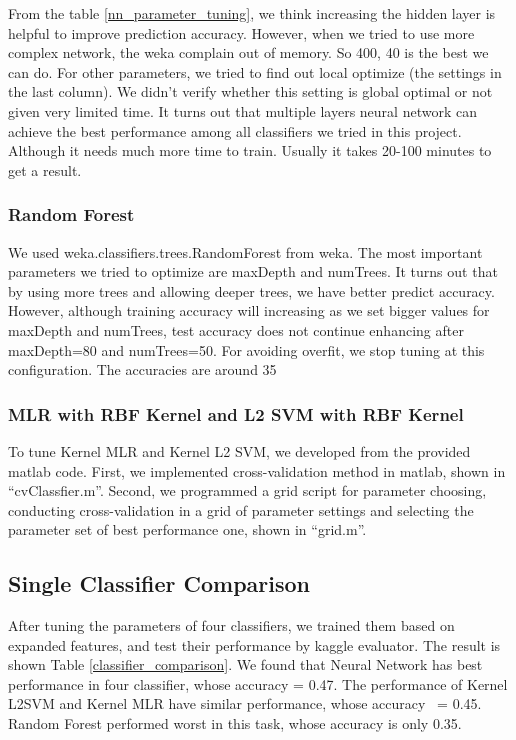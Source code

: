 \documentclass{acm_proc_article-sp}
\begin{document}
From the table \ref{nn_parameter_tuning}, we think increasing the hidden layer is helpful to improve prediction accuracy. However, when we tried to use more complex network, the weka complain out of memory. So 400, 40 is the best we can do. For other parameters, we tried to find out local optimize (the settings in the last column). We didn’t verify whether this setting is global optimal or not given very limited time.
It turns out that multiple layers neural network can achieve the best performance among all classifiers we tried in this project. Although it needs much more time to train. Usually it takes 20-100 minutes to get a result.

\subsubsection*{Random Forest}

We used weka.classifiers.trees.RandomForest from weka. The most important parameters we tried to optimize are maxDepth and numTrees. It turns out that by using more trees and allowing deeper trees, we have better predict accuracy. However, although training accuracy will increasing as we set bigger values for maxDepth and numTrees, test accuracy does not continue enhancing after maxDepth=80 and numTrees=50. For avoiding overfit, we stop tuning at this configuration. The accuracies are around 35%

\subsubsection*{MLR with RBF Kernel and L2 SVM with RBF Kernel}

To tune Kernel MLR and Kernel L2 SVM, we developed from the provided matlab code. First, we implemented cross-validation method in matlab, shown in “cvClassfier.m”. Second, we programmed a grid script for parameter choosing, conducting cross-validation in a grid of parameter settings and selecting the parameter set of best performance one, shown in “grid.m”.

\subsection{Single Classifier Comparison}

After tuning the parameters of four classifiers, we trained them based on expanded features, and test their performance by kaggle evaluator. The result is shown Table \ref{classifier_comparison}. We found that Neural Network has best performance in four classifier, whose accuracy = 0.47. The performance of Kernel L2SVM and Kernel MLR have similar performance, whose accuracy ~= 0.45. Random Forest performed worst in this task, whose accuracy is only 0.35.
\end{document}
